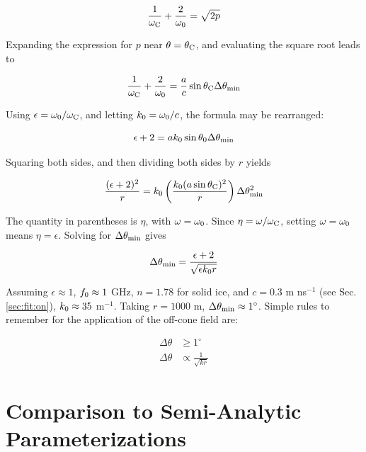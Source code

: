 \documentclass[amsmath,amssymb,aps,prd,10pt,twocolumn]{revtex4}
\begin{document}
\begin{equation}
\frac{1}{\omega_{\rm C}} + \frac{2}{\omega_{\rm 0}} = \sqrt{2p}
\end{equation}

Expanding the expression for $p$ near $\theta = \theta_{\rm C}$, and evaluating the square root leads to

\begin{equation}
\frac{1}{\omega_{\rm C}} + \frac{2}{\omega_{\rm 0}} = \frac{a}{c}\sin\theta_{\rm C} \Delta\theta_{\rm min}
\end{equation}

Using $\epsilon = \omega_{\rm 0}/\omega_{\rm C}$, and letting $k_{\rm 0} = \omega_{\rm 0}/c$, the formula may be rearranged:

\begin{equation}
\epsilon + 2 = a k_{\rm 0} \sin\theta_{\rm 0}\Delta\theta_{\rm min}
\end{equation}

Squaring both sides, and then dividing both sides by $r$ yields

\begin{equation}
\frac{(\epsilon+2)^2}{r} = k_{\rm 0} \left(\frac{k_{\rm 0} (a\sin\theta_{\rm C})^2}{r}\right)\Delta\theta^2_{\rm min}
\end{equation}

The quantity in parentheses is $\eta$, with $\omega = \omega_{\rm 0}$.  Since $\eta = \omega/\omega_{\rm C}$, setting $\omega = \omega_{\rm 0}$ means $\eta = \epsilon$.  Solving for $\Delta\theta_{\rm min}$ gives

\begin{equation}
\Delta\theta_{\rm min} = \frac{\epsilon+2}{\sqrt{\epsilon k_{\rm 0} r}}
\end{equation}

Assuming $\epsilon \approx 1$, $f_{\rm 0} \approx 1$ GHz, $n = 1.78$ for solid ice, and $c = 0.3$ m ns$^{-1}$ (see Sec. \ref{sec:fit:on}), $k_{\rm 0} \approx 35$ m$^{-1}$.  Taking $r = 1000$ m, $\Delta\theta_{\rm min} \approx 1^{\circ}$.  Simple rules to remember for the application of the off-cone field are:

\begin{align}
\Delta\theta &\geq 1^{\circ} \\
\Delta\theta &\propto \frac{1}{\sqrt{kr}}
\end{align}

\section{Comparison to Semi-Analytic Parameterizations}
\label{sec:fit}
\end{document}
